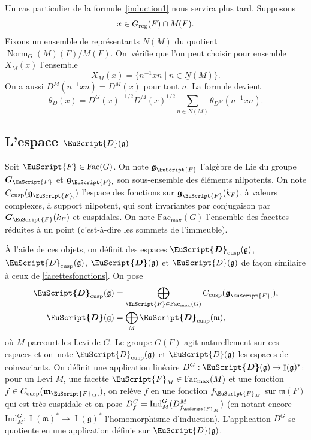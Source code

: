 \documentclass[JEP,XML,SOM,Unicode,francais]{cedram}
\let\mathcal \EuScript
\newcommand{\NoChangel}[1]{%
\expandafter\let\csname old\string#1\endcsname=#1
\let#1=\relax
\newcommand{#1}{\mathcode`l="716C\csname old\string#1\endcsname\mathcode`l="7160 }%
}
\let\sep\mid
\newcommand{\frg}{\mathfrak{g}}
\newcommand{\mfrm}{\mathfrak{m}}
\newcommand{\cusp}{\mathrm{cusp}}
\newcommand{\rell}{\mathrm{ell}} \NoChangel{\rell}
\newcommand{\Fac}{\mathrm{Fac}}
\newcommand{\Ind}{\mathrm{Ind}}
\newcommand{\nil}{\mathrm{nil}} \NoChangel{\nil}
\newcommand{\reg}{\mathrm{reg}}
\DeclareMathOperator{\rI}{I}
\DeclareMathOperator{\Norm}{Norm}
\newcommand{\bG}{\boldsymbol{G}}
\newcommand{\cD}{\mathcal{D}}
\newcommand{\cF}{\mathcal{F}}
\theoremstyle{plain}
\theoremstyle{definition}
\begin{document}
Un cas particulier de la formule~\eqref{induction1} nous servira plus tard. Supposons
\[
x\in G_{\reg}(F)\cap M_{\rell}(F).
\]
Fixons un ensemble de représentants $\underline{N}(M)$ du quotient $\Norm_{G}(M)(F)/ M(F)$. On~véri\-fie que l'on peut choisir pour ensemble $X_{M}(x)$ l'ensemble
\[
X_{M}(x)=\{n^{-1}xn\sep n\in \underline{N}(M)\}.
\]
On a aussi $D^M(n^{-1}xn)=D^M(x)$ pour tout $n$. La formule devient
\begin{equation}\tag{3}\label{induction3}
\theta_{D}(x)=D^G(x)^{-1/2}D^M(x)^{1/2}\sum_{n\in \underline{N}(M)}\theta_{D^M}(n^{-1}xn).
\end{equation}

\subsection{L'espace \texorpdfstring{$\cD(\frg)$}{Dg}}\label{lespace}

Soit $\cF\in \Fac(G)$. On note $\boldsymbol{\frg}_{\cF}$ l'algèbre de Lie du groupe $\bG_{\cF}$ et $\boldsymbol{\frg}_{\cF,\nil}$ son sous-ensemble des éléments nilpotents. On note $C_{\cusp}(\boldsymbol{\frg}_{\cF,\nil})$ l'espace des fonctions sur $\boldsymbol{\frg}_{\cF}(k_{F})$, à valeurs complexes, à support nilpotent, qui sont invariantes par conjugaison par $\bG_{\cF}(k_{F})$ et cuspidales. On note $\Fac_{\max}(G)$ l'ensemble des facettes réduites à un point (c'est-à-dire les sommets de l'immeuble).

À l'aide de ces objets, on définit des espaces $\boldsymbol{\cD}_{\cusp}(\frg)$, $\cD_{\cusp}(\frg)$, $\boldsymbol{\cD}(\frg)$ et $\cD(\frg)$ de façon similaire à ceux de \ref{facettesfonctions}. On pose\vspace*{-3pt}
\begin{align*}
\boldsymbol{\cD}_{\cusp}(\frg)&=\bigoplus_{\cF\in \Fac_{\max}(G)}C_{\cusp}(\boldsymbol{\frg}_{\cF,\nil}),
\\
\boldsymbol{\cD}(\frg)&=\bigoplus_{M}\boldsymbol{\cD}_{\cusp}(\mfrm),
\end{align*}
où $M$ parcourt les Levi de $G$. Le groupe $G(F)$ agit naturellement sur ces espaces et on~note $\cD_{\cusp}(\frg)$ et $\cD(\frg)$ les espaces de coinvariants. On définit une application linéaire $D^G:\boldsymbol{\cD}(\frg)\to \rI(\frg)^*$: pour un Levi $M$, une facette $\cF_{M}\in \Fac_{\max}(M)$ et une fonction $f\in C_{\cusp}(\boldsymbol{\mfrm}_{\cF_{M},\nil})$, on relève $f$ en une fonction $f_{\cF_{M}}$ sur $\mfrm(F)$ qui est très cuspidale et on pose $D^G_{f}=\Ind_{M}^G(D^M_{f_{\cF_{M}}})$ (en notant encore $\Ind_{M}^G:\rI(\mfrm)^*\to \rI(\frg)^*$ l'homomorphisme d'induction). L'application $D^G$ se quotiente en une application définie sur $\cD(\frg)$.
\end{document}
